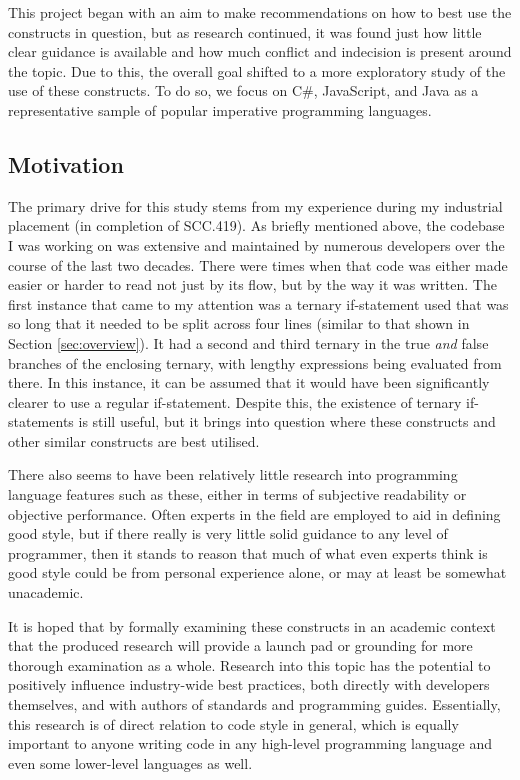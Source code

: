 \documentclass{article}
\begin{document}
        This project began with an aim to make recommendations on how to best use the constructs in question, but as research continued, it was found just how little clear guidance is available and how much conflict and indecision is present around the topic. Due to this, the overall goal shifted to a more exploratory study of the use of these constructs. To do so, we focus on C\#, JavaScript, and Java as a representative sample of popular imperative programming languages.

    \subsection{Motivation}
        The primary drive for this study stems from my experience during my industrial placement (in completion of SCC.419). As briefly mentioned above, the codebase I was working on was extensive and maintained by numerous developers over the course of the last two decades. There were times when that code was either made easier or harder to read not just by its flow, but by the way it was written. The first instance that came to my attention was a ternary if-statement used that was so long that it needed to be split across four lines (similar to that shown in Section \ref{sec:overview}). It had a second and third ternary in the true \emph{and} false branches of the enclosing ternary, with lengthy expressions being evaluated from there. In this instance, it can be assumed that it would have been significantly clearer to use a regular if-statement. Despite this, the existence of ternary if-statements is still useful, but it brings into question where these constructs and other similar constructs are best utilised.

        There also seems to have been relatively little research into programming language features such as these, either in terms of subjective readability or objective performance. Often experts in the field are employed to aid in defining good style, but if there really is very little solid guidance to any level of programmer, then it stands to reason that much of what even experts think is good style could be from personal experience alone, or may at least be somewhat unacademic.
        
        It is hoped that by formally examining these constructs in an academic context that the produced research will provide a launch pad or grounding for more thorough examination as a whole. Research into this topic has the potential to positively influence industry-wide best practices, both directly with developers themselves, and with authors of standards and programming guides. Essentially, this research is of direct relation to code style in general, which is equally important to anyone writing code in any high-level programming language and even some lower-level languages as well.
\end{document}
